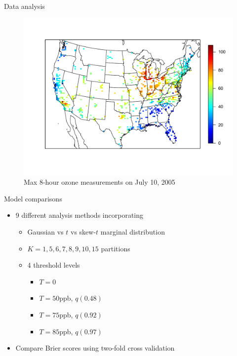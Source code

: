 \documentclass{beamer}
\begin{document}
\begin{frame}{Data analysis}
  \centering
  \begin{figure}
    \includegraphics[width=\linewidth, trim=0 1in 0 0.7in ]{./plots/pot/ozone-10jul-us.pdf}
    \caption{Max 8-hour ozone measurements on July 10, 2005}
   \end{figure}
\end{frame}


\begin{frame}{Model comparisons}
  \begin{itemize} \setlength{\itemsep}{1em}
    \item 9 different analysis methods incorporating
    \begin{itemize}
      \item Gaussian vs $t$ vs skew-$t$ marginal distribution
      \item $K=1, 5, 6, 7, 8, 9, 10, 15$ partitions
      \item 4 threshold levels
      \begin{itemize}
         \item $T = 0$
         \item $T = 50$ppb, $q(0.48)$
         \item $T = 75$ppb, $q(0.92)$
         \item $T = 85$ppb, $q(0.97)$
      \end{itemize}
    \end{itemize}
    \item Compare Brier scores using two-fold cross validation
  \end{itemize}
\end{frame}
\end{document}
